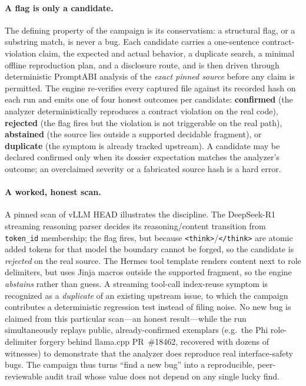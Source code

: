 \documentclass[10pt]{article}
\begin{document}
\paragraph{A flag is only a candidate.} The defining property of the campaign is
its conservatism: a structural flag, or a substring match, is never a bug. Each
candidate carries a one-sentence contract-violation claim, the expected and
actual behavior, a duplicate search, a minimal offline reproduction plan, and a
disclosure route, and is then driven through deterministic PromptABI analysis of
the \emph{exact pinned source} before any claim is permitted. The engine
re-verifies every captured file against its recorded hash on each run and emits
one of four honest outcomes per candidate: \textbf{confirmed} (the analyzer
deterministically reproduces a contract violation on the real code),
\textbf{rejected} (the flag fires but the violation is not triggerable on the
real path), \textbf{abstained} (the source lies outside a supported decidable
fragment), or \textbf{duplicate} (the symptom is already tracked upstream). A
candidate may be declared confirmed only when its dossier expectation matches the
analyzer's outcome; an overclaimed severity or a fabricated source hash is a hard
error.

\paragraph{A worked, honest scan.} A pinned scan of vLLM HEAD illustrates the
discipline. The DeepSeek-R1 streaming reasoning parser decides its
reasoning/content transition from \texttt{token\_id} membership; the flag fires,
but because \texttt{<think>}/\texttt{</think>} are atomic added tokens for that
model the boundary cannot be forged, so the candidate is \emph{rejected} on the
real source. The Hermes tool template renders content next to role delimiters,
but uses Jinja macros outside the supported fragment, so the engine
\emph{abstains} rather than guess. A streaming tool-call index-reuse symptom is
recognized as a \emph{duplicate} of an existing upstream issue, to which the
campaign contributes a deterministic regression test instead of filing noise. No
new bug is claimed from this particular scan---an honest result---while the run
simultaneously replays public, already-confirmed exemplars (e.g.\ the Phi
role-delimiter forgery behind llama.cpp PR~\#18462, recovered with dozens of
witnesses) to demonstrate that the analyzer does reproduce real interface-safety
bugs. The campaign thus turns ``find a new bug'' into a reproducible,
peer-reviewable audit trail whose value does not depend on any single lucky find.
\end{document}
